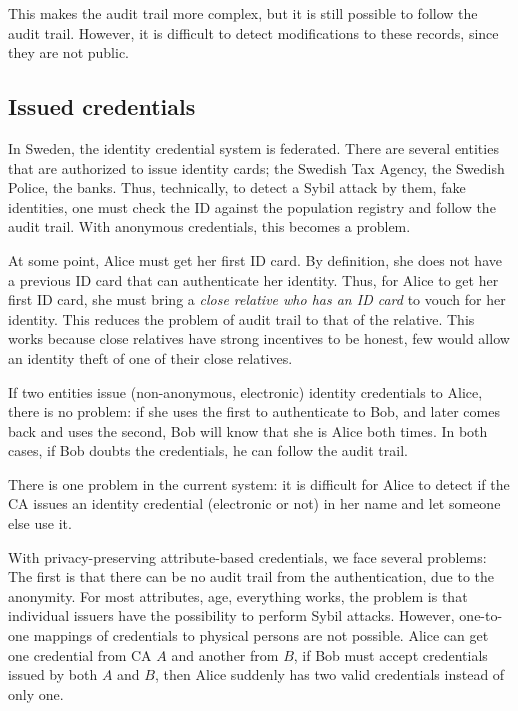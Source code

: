 This makes the audit trail more complex, but it is still possible to follow the 
audit trail.
However, it is difficult to detect modifications to these records, since they 
are not public.

%


\subsection{Issued credentials}

In Sweden, the identity credential system is federated.
There are several entities that are authorized to issue identity cards; \eg the 
Swedish Tax Agency, the Swedish Police, the banks.
Thus, technically, to detect a Sybil attack by them, \ie fake identities, one 
must check the ID against the population registry and follow the audit trail.
With anonymous credentials, this becomes a problem.

At some point, Alice must get her first ID card.
By definition, she does not have a previous ID card that can authenticate her 
identity.
Thus, for Alice to get her first ID card, she must bring a \emph{close relative 
  who has an ID card} to vouch for her identity.
This reduces the problem of audit trail to that of the relative.
This works because close relatives have strong incentives to be honest, few 
would allow an identity theft of one of their close relatives.

If two entities issue (non-anonymous, electronic) identity credentials to 
Alice, there is no problem: if she uses the first to authenticate to Bob, and 
later comes back and uses the second, Bob will know that she is Alice both 
times.
In both cases, if Bob doubts the credentials, he can follow the audit trail.

There is one problem in the current system: it is difficult for Alice to detect 
if the \ac{CA} issues an identity credential (electronic or not) in her name 
and let someone else use it.

With privacy-preserving attribute-based credentials, we face several problems:
The first is that there can be no audit trail from the authentication, due to 
the anonymity.
For most attributes, \eg age, everything works, the problem is that individual 
issuers have the possibility to perform Sybil attacks.
However, one-to-one mappings of credentials to physical persons are not 
possible.
Alice can get one credential from \ac{CA} \(A\) and another from \(B\), if Bob 
must accept credentials issued by both \(A\) and \(B\), then Alice suddenly has 
two valid credentials instead of only one.


